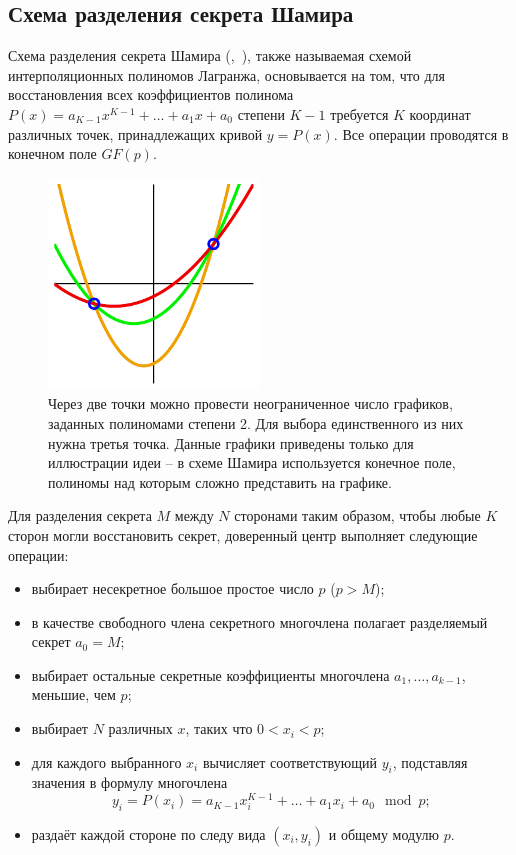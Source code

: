 \subsection[Схема Шамира]{Схема разделения секрета Шамира}

Схема разделения секрета Шамира (,~\cite{Shamir:1979}), также называемая схемой интерполяционных полиномов Лагранжа, основывается на том, что для восстановления всех коэффициентов полинома $P(x) = a_{K-1}x^{K-1} + \dots + a_1 x + a_0$ степени $K-1$ требуется $K$ координат различных точек, принадлежащих кривой $y=P(x)$. Все операции проводятся в конечном поле $GF(p)$.

\begin{figure}[thb]
	\centering
	\includegraphics[width=0.5\textwidth]{pic/shamir}
  \caption{Через две точки можно провести неограниченное число графиков, заданных полиномами степени 2. Для выбора единственного из них нужна третья точка. Данные графики приведены только для иллюстрации идеи -- в схеме Шамира используется конечное поле, полиномы над которым сложно представить на графике.}
  \label{fig:shamir}
\end{figure}

Для разделения секрета $M$ между $N$ сторонами таким образом, чтобы любые $K$ сторон могли восстановить секрет, доверенный центр выполняет следующие операции:
\begin{itemize}
	\item выбирает несекретное большое простое число $p$ ($p > M$);
	\item в качестве свободного члена секретного многочлена полагает разделяемый секрет $a_0 = M$;
	\item выбирает остальные секретные коэффициенты многочлена $a_1, \dots, a_{k-1}$, меньшие, чем $p$;
	\item выбирает $N$ различных $x$, таких что $0 < x_i < p$;
	\item для каждого выбранного $x_i$ вычисляет соответствующий $y_i$, подставляя значения в формулу многочлена
		\[ y_i = P( x_i ) = a_{K-1}x_i^{K-1} + \dots + a_1 x_i + a_0 \mod p ;\]
	\item раздаёт каждой стороне по следу вида $(x_i, y_i)$ и общему модулю $p$.
\end{itemize}

